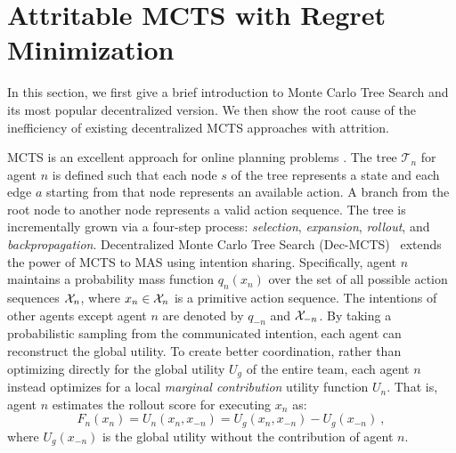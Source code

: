 \section{Attritable MCTS with Regret Minimization}

In this section, we first give a brief introduction to Monte Carlo Tree Search and its most popular decentralized version. We then show the root cause of the inefficiency of existing decentralized MCTS approaches with attrition. 


MCTS is an excellent approach for online planning problems \citep{kocsis2006improved}. The tree $\mathcal{T}_n$ for agent $n$ is defined such that each node $s$ of the tree represents a state and each edge $a$ starting from that node represents an available action. A branch from the root node to another node represents a valid action sequence. The tree is incrementally grown via a four-step process: \emph{selection}, \emph{expansion}, \emph{rollout}, and \emph{backpropagation}. Decentralized Monte Carlo Tree Search (Dec-MCTS)~\citep{best2019dec} extends the power of MCTS to MAS using intention sharing. Specifically, agent $n$ maintains a probability mass function $q_n(x_n)$ over the set of all possible action sequences $\mathcal{X}_n$, where $x_n \in \mathcal{X}_n$ is a primitive action sequence. The intentions of other agents except agent $n$ are denoted by $q_{-n}$ and $\mathcal{X}_{-n}$. By taking a probabilistic sampling from the communicated intention, each agent can reconstruct the global utility. To create better coordination, rather than optimizing directly for the global utility $U_g$ of the entire team, each agent $n$ instead optimizes for a local \emph{marginal contribution} utility function $U_n$. That is, agent $n$ estimates the rollout score for executing $x_n$ as: 
\begin{equation} 
\label{eq:marginal}
     F_n(x_n) = U_n(x_n, x_{-n}) = U_g(x_n, x_{-n}) - U_g(x_{-n})\ ,
\end{equation}
where $U_g(x_{-n})$ is the global utility without the contribution of agent $n$.

